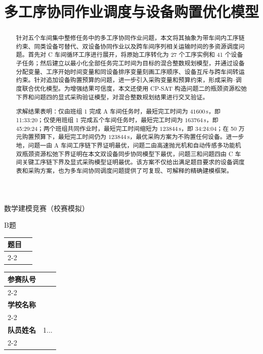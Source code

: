 \documentclass{gmcmthesis}
\title{多工序协同作业调度与设备购置优化模型}
\makeatletter
\numberwithin{figure}{section}
\numberwithin{table}{section}
\renewcommand{\maketitle}{%
  \thispagestyle{empty}%
  \vspace*{2.5cm}
  \begin{center}
    {\xinwei\zihao{2} 数学建模竞赛（校赛模拟）\par}
    \vskip0.4cm
    {\zihao{3}\heiti B\quad 题\par}
    \vskip1.8cm
    \begin{tabularx}{.95\textwidth}{@{}lX@{}}
      {\zihao{4} 题\qquad 目} & \hfill\zihao{-3}\heiti \@title \hfill\null \\
      \cline{2-2}
    \end{tabularx}
  \end{center}
  \vfill
  \renewcommand{\arraystretch}{1.8}%
  \noindent\begin{tabularx}{\textwidth}{lX}
    {\zihao{4}\bfseries 参赛队号} & {\zihao{4} \gmcm@tokens@baominghao} \\
    \cline{2-2}\\[-12pt]
    {\zihao{4}\bfseries 学校名称} & {\zihao{4} \gmcm@tokens@schoolname} \\
    \cline{2-2}\\[-12pt]
    {\zihao{4}\bfseries 队员姓名} & {\zihao{4} 1.\;\gmcm@tokens@membera \quad 2.\;\gmcm@tokens@memberb \quad 3.\;\gmcm@tokens@memberc} \\
    \cline{2-2}
  \end{tabularx}
  \vspace{2.5cm}
  \newpage
}
\makeatother
\begin{document}
\maketitle

\begin{abstract}
针对五个车间集中整修任务中的多工序协同作业问题，本文将其抽象为带车间内工序链约束、同类设备可替代、双设备协同作业以及跨车间序列相关运输时间的多资源调度问题。首先对 C 车间循环工序进行展开，将原始工序转化为 27 个工序实例和 41 个设备子任务；然后建立以最小化全部任务完工时间为目标的混合整数规划模型，并通过设备分配变量、工序开始时间变量和同设备排序变量刻画工序顺序、设备互斥与跨车间转运约束。针对追加设备购置预算的问题，进一步引入采购变量和预算约束，形成采购--调度联合优化模型。为增强结果可信度，本文还使用 CP-SAT 构造问题二的瓶颈资源松弛下界和问题四的显式采购验证模型，对混合整数规划结果进行交叉验证。

求解结果表明：仅由班组 1 完成 A 车间任务时，最短完工时间为 $41600\,\mathrm{s}$，即 11:33:20；仅使用班组 1 完成五个车间任务时，最短完工时间为 $163764\,\mathrm{s}$，即 45:29:24；两个班组共同作业时，最短完工时间缩短为 $123844\,\mathrm{s}$，即 34:24:04；在 50 万元购置预算下，最短完工时间仍为 $123844\,\mathrm{s}$，最优采购方案为不购置任何设备。进一步地，问题一由 A 车间工序链下界证明最优，问题二由高速抛光机和自动传感多功能机双瓶颈资源松弛下界证明在本文双设备同步协同模型下最优，问题三和问题四由 C 车间关键工序链下界及显式采购模型证明最优。该方案不仅给出满足题目要求的设备调度表和采购方案，也为多车间协同调度问题提供了可复现、可解释的精确建模框架。

\end{abstract}

\tableofcontents
\clearpage


\clearpage
\printbibliography                  %

\clearpage
\appendix
\end{document}
